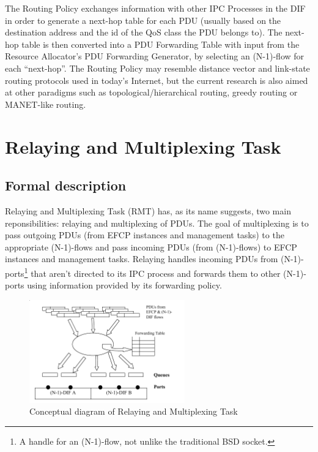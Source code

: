         The Routing Policy exchanges information with other IPC Processes in the DIF in order to generate a next-hop table for each PDU (usually based on the destination address and the id of the QoS class the PDU belongs to). The next-hop table is then converted into a PDU Forwarding Table with input from the Resource Allocator's PDU Forwarding Generator, by selecting an (N-1)-flow for each ``next-hop''. The Routing Policy may resemble distance vector and link-state routing protocols used in today's Internet, but the current research is also aimed at other paradigms such as topological/hierarchical routing, greedy routing or MANET-like routing.


    \section{Relaying and Multiplexing Task}

        \subsection{Formal description}

            Relaying and Multiplexing Task (RMT) has, as its name suggests, two main reponsibilities: relaying and multiplexing of PDUs. The goal of multiplexing is to pass outgoing PDUs (from EFCP instances and management tasks) to the appropriate (N-1)-flows and pass incoming PDUs (from (N-1)-flows) to EFCP instances and management tasks. Relaying handles incoming PDUs from (N-1)-ports\footnote{A handle for an (N-1)-flow, not unlike the traditional BSD socket.} that aren't directed to its IPC process and forwards them to other (N-1)-ports using information provided by its forwarding policy.

            \begin{figure}[H]
                \begin{center}
                    \includegraphics[width=0.6\textwidth]{fig/fwding_rmt-module.png}
                  \caption{Conceptual diagram of Relaying and Multiplexing Task}
                  \label{fig:rmt1}
                \end{center}
            \end{figure}

